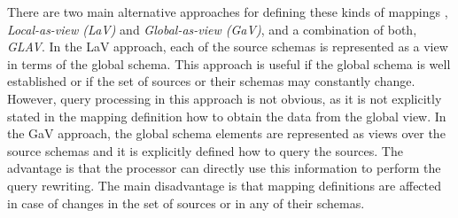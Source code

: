 There are two main alternative approaches for defining these kinds of mappings \cite{Lenzerini_02}, \textit{Local-as-view (LaV)}
and \textit{Global-as-view (GaV)}, and a combination of both, \textit{GLAV}. In the LaV approach, each of the source
schemas is represented as a view in terms of the global schema.
This approach is useful if the global schema is well established or if the set of sources or their schemas may constantly change.
However, query processing in this approach is not obvious, as it is not explicitly stated in the mapping definition how
to obtain the data from the global view.
In the GaV approach, the global schema elements are represented as views over the source schemas and it is explicitly defined how to query the sources. The advantage is that the processor can directly use this information to perform the query rewriting. The main disadvantage is that mapping definitions are affected in case of changes in the set of sources or in any of their schemas.  %



